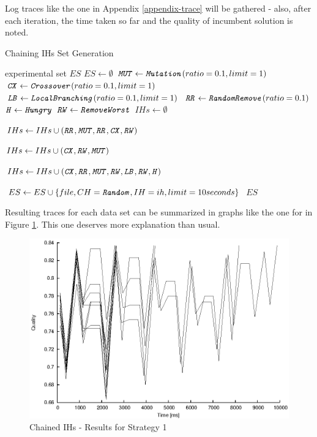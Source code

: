 Log traces like the one in Appendix \ref{appendix-trace} will be gathered - also, after each iteration, the time taken so far and the quality of incumbent solution is noted.\\

\begin{algorithm}
\caption{Chaining IHs Set Generation}
\label{listing-experiment-chaining-ihs}
\begin{algorithmic}
\ENSURE experimental set $ES$
\STATE $ES \gets \emptyset$
\STATE $\texttt{\textit{MUT}} \gets \texttt{\textit{Mutation}}(ratio = 0.1, limit = 1)$
\STATE $\texttt{\textit{CX}} \gets \texttt{\textit{Crossover}}(ratio = 0.1, limit = 1)$
\STATE $\texttt{\textit{LB}} \gets \texttt{\textit{LocalBranching}}(ratio = 0.1, limit = 1)$
\STATE $\texttt{\textit{RR}} \gets \texttt{\textit{RandomRemove}}(ratio = 0.1)$
\STATE $\texttt{\textit{H}} \gets \texttt{\textit{Hungry}}$
\STATE $\texttt{\textit{RW}} \gets \texttt{\textit{RemoveWorst}}$
\STATE $IHs \gets \emptyset$

\STATE $IHs \gets IHs \cup (\texttt{\textit{RR}}, \texttt{\textit{MUT}}, \texttt{\textit{RR}}, \texttt{\textit{CX}}, \texttt{\textit{RW}})$

\STATE $IHs \gets IHs \cup (\texttt{\textit{CX}}, \texttt{\textit{RW}}, \texttt{\textit{MUT}})$

\STATE $IHs \gets IHs \cup (\texttt{\textit{CX}}, \texttt{\textit{RR}}, \texttt{\textit{MUT}}, \texttt{\textit{RW}}, \texttt{\textit{LB}}, \texttt{\textit{RW}}, \texttt{\textit{H}})$

      \STATE $ES \gets ES \cup \{file, CH = \texttt{\textit{Random}}, IH = ih, limit = 10 seconds\}$
    \ENDFOR
  \ENDFOR
\ENDFOR
\RETURN $ES$
\end{algorithmic}
\end{algorithm}

Resulting traces for each data set can be summarized in graphs like the one for  in Figure \ref{image-experiment-chained-ihs-s1}. This one deserves more explanation than usual.

\begin{figure}
  \caption{Chained IHs -  Results for Strategy 1}
  \label{image-experiment-chained-ihs-s1}
  \centering
    \includegraphics[width=\textwidth]{images/experiments/chained-ihs-s1}
\end{figure}

